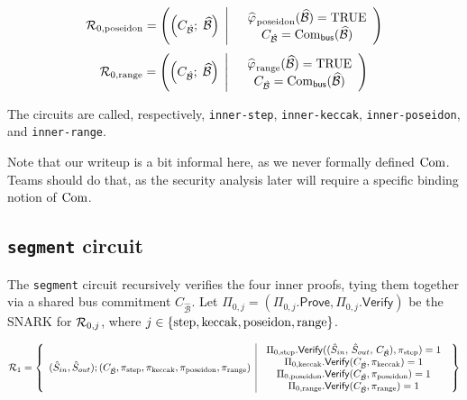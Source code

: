 \begin{equation}\label{eq:rel-inner-poseidon}
  \mathcal{R}_{0,\mathrm{poseidon}} =\left(
   \left( C_{\hat{\mathcal{B}}} ;\;
  \widehat{\mathcal{B}} \right)\;\Bigg|\quad
  \begin{array}{c}
    \widehat{\varphi_{\mathrm{}}}_{\mathrm{poseidon}}(\widehat{\mathcal{B}})=\mathrm{TRUE}\\
    C_{\hat{\mathcal{B}}} = \mathrm{Com}_{\mathsf{bus}}(\widehat{\mathcal{B}})
  \end{array}
 \right)
\end{equation}
\begin{equation}\label{eq:rel-inner-range}
  \mathcal{R}_{0,\mathrm{range}} =\left(
   \left( C_{\hat{\mathcal{B}}} ;\;
  \widehat{\mathcal{B}} \right)\;\Bigg|\quad
  \begin{array}{c}
    \widehat{\varphi_{\mathrm{}}}_{\mathrm{range}}(\widehat{\mathcal{B}})=\mathrm{TRUE}\\
    C_{\hat{\mathcal{B}}} = \mathrm{Com}_{\mathsf{bus}}(\widehat{\mathcal{B}})
  \end{array}
 \right)
\end{equation}

The circuits are called, respectively,
\texttt{inner-step}, \texttt{inner-keccak}, \texttt{inner-poseidon}, and \texttt{inner-range}.
\begin{instruction}
Note that our writeup is a bit informal here, as we never formally defined $\mathrm{Com}$. Teams should do that, as the security analysis later will require a specific binding notion of $\mathrm{Com}$.
\end{instruction}

\subsection{ \texttt{segment} circuit}

The \texttt{segment} circuit recursively verifies the four inner proofs,
tying them together via a shared bus commitment $C_{\hat{\mathcal{B}}}$.
Let $\Pi_{0,j}=(\Pi_{0,j}.\mathsf{Prove}, \Pi_{0,j}.\mathsf{Verify})$
be the SNARK for $\mathcal{R}_{0,j}$, where $j\in\{\mathrm{step},\mathrm{keccak},\mathrm{poseidon},\mathrm{range}\}$.

\[
  \scalebox{0.90}{$\displaystyle
  \relation_1=\left\lbrace\begin{array}{c|c} (\hat{S}_{in},
   \hat{S}_{out});(C_{\hat{\mathcal{B}}},\pi_\step,\pi_\keccak,\pi_\poseidon,\pi_\range) &
    \begin{array}{c}
   \Pi_{0,\step}.\mathsf{Verify}((\hat{S}_{in},\, \hat{S}_{out},\, C_{\hat{\mathcal{B}}}), \pi_\step)=1\\
    \Pi_{0,\keccak}.\mathsf{Verify}( C_{\hat{\mathcal{B}}}, \pi_\keccak)=1\\
    \Pi_{0,\poseidon}.\mathsf{Verify}( C_{\hat{\mathcal{B}}}, \pi_\poseidon)=1\\
    \Pi_{0,\range}.\mathsf{Verify}( C_{\hat{\mathcal{B}}}, \pi_\range)=1
    \end{array}
  \end{array}\right\rbrace
  $}
\]


